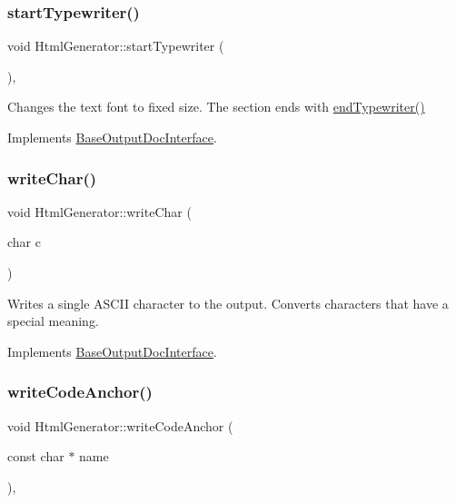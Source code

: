 \subsubsection{\texorpdfstring{startTypewriter()}{startTypewriter()}}
{\footnotesize\ttfamily void Html\+Generator\+::start\+Typewriter (\begin{DoxyParamCaption}{ }\end{DoxyParamCaption})\hspace{0.3cm}{\ttfamily [inline]}, {\ttfamily [virtual]}}

Changes the text font to fixed size. The section ends with \mbox{\hyperlink{class_html_generator_a574b29296b93ffa4c3b119cbee70269c}{end\+Typewriter()}} 

Implements \mbox{\hyperlink{class_base_output_doc_interface_abde41a60b900d35b0b198f43731c1cd0}{Base\+Output\+Doc\+Interface}}.

\mbox{\label{class_html_generator_a71e6263d7ffef2cc600e289be06c4f33}} 
\subsubsection{\texorpdfstring{writeChar()}{writeChar()}}
{\footnotesize\ttfamily void Html\+Generator\+::write\+Char (\begin{DoxyParamCaption}\item[{char}]{c }\end{DoxyParamCaption})\hspace{0.3cm}{\ttfamily [virtual]}}

Writes a single A\+S\+C\+II character to the output. Converts characters that have a special meaning. 

Implements \mbox{\hyperlink{class_base_output_doc_interface_a1577324720c1c71142dff84ae80b058d}{Base\+Output\+Doc\+Interface}}.

\mbox{\label{class_html_generator_a9e2528347c04b6f07dd9263441dbcf4f}} 
\subsubsection{\texorpdfstring{writeCodeAnchor()}{writeCodeAnchor()}}
{\footnotesize\ttfamily void Html\+Generator\+::write\+Code\+Anchor (\begin{DoxyParamCaption}\item[{const char $\ast$}]{name }\end{DoxyParamCaption})\hspace{0.3cm}{\ttfamily [inline]}, {\ttfamily [virtual]}}

